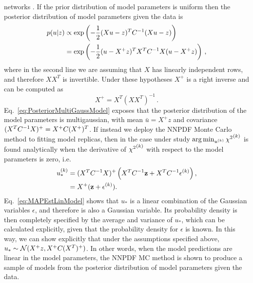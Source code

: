 networks \cite{ADVANI2020428}. If the prior distribution of model parameters is
uniform then the posterior distribution of model parameters given the data is
\begin{equation}
    \label{eq:PosteriorMultiGaussModel}
    \begin{split}
        p(u | z) &\propto
        \exp \left( -\frac{1}{2} (Xu - z)^T C^{-1}_{} (Xu - z)\right) \\
        &= \exp \left( -\frac{1}{2} (u - X^+z)^T X^TC^{-1}_{}X (u - X^+z)\right)\, ,
    \end{split}
\end{equation}
where in the second line we are assuming that $X$ has linearly independent rows,
and therefore $X X^T$ is invertible. Under these hypotheses $X^+$ is a
right inverse and can be computed as
\begin{equation}
    \label{eq:RightInverse}
    X^+ = X^T \left(X X^T\right)^{-1}\, .
\end{equation}
Eq.~\ref{eq:PosteriorMultiGaussModel} exposes that the posterior distribution of
the model parameters is multigaussian, with mean $\bar{u} = X^+z$ and covariance
$(X^TC^{-1}_{}X)^+ = X^+ C (X^+)^T$. If instead we deploy the NNPDF Monte
Carlo method to fitting model replicas, then in the case under study
$\arg\min_{u^{(k)}} {\chi^2}^{(k)}$ is found analytically when the derivative of
${\chi^2}^{(k)}$ with respect to the model parameters is zero, i.e.
\begin{equation}
    \begin{split}
        \label{eq:MAPEstLinModel}
        u^{(k)}_* &= (X^TC^{-1}_{}X)^{+}
        \left( X^T C^{-1}_{} \mathbf{z} + X^T C^{-1}_{} \mathbf{\epsilon}^{(k)} \right), \\
        &= X^+ (\mathbf{z} + \mathbf{\epsilon}^{(k)}).
    \end{split}
\end{equation}
Eq.~\ref{eq:MAPEstLinModel} shows that $u_*$ is a linear combination of the
Gaussian variables $\epsilon$, and therefore is also a Gaussian variable. Its
probability density is then completely specified by the average and variance of
$u_*$, which can be calculated explicitly, given that the probability density
for $\epsilon$ is known.  In this way, we can show explicitly that under the
assumptions specified above, $u_* \sim \mathcal{N}( X^+z, X^+ C (X^T)^+)$.
In other words, when the model predictions are linear in the model parameters,
the NNPDF MC method is shown to produce a sample of models from the posterior
distribution of model parameters given the data.

